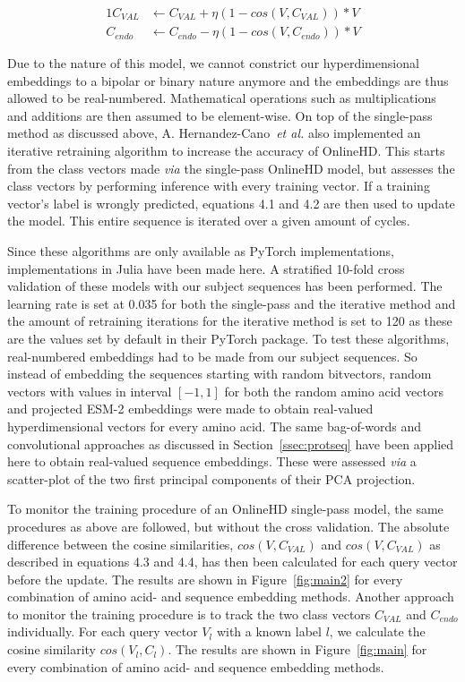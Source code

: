 \begin{alignat}{1}
    \label{eqn:onlinehd2}
    C_{VAL} &\leftarrow C_{VAL} + \eta (1 - cos(V, C_{VAL})) * V \\
    C_{endo} &\leftarrow C_{endo} - \eta (1 - cos(V, C_{endo})) * V
\end{alignat}

Due to the nature of this model, we cannot constrict our hyperdimensional embeddings to a bipolar or binary nature anymore and the embeddings are thus allowed to be real-numbered. Mathematical operations such as multiplications and additions are then assumed to be element-wise. On top of the single-pass method as discussed above, A. Hernandez-Cano~\textit{et al.} also implemented an iterative retraining algorithm to increase the accuracy of OnlineHD. This starts from the class vectors made \textit{via} the single-pass OnlineHD model, but assesses the class vectors by performing inference with every training vector. If a training vector's label is wrongly predicted, equations 4.1 and 4.2 are then used to update the model. This entire sequence is iterated over a given amount of cycles.

Since these algorithms are only available as PyTorch implementations, implementations in Julia have been made here. A stratified 10-fold cross validation of these models with our subject sequences has been performed. The learning rate is set at 0.035 for both the single-pass and the iterative method and the amount of retraining iterations for the iterative method is set to 120 as these are the values set by default in their PyTorch package. To test these algorithms, real-numbered embeddings had to be made from our subject sequences. So instead of embedding the sequences starting with random bitvectors, random vectors with values in interval $[-1, 1]$ for both the random amino acid vectors and projected ESM-2 embeddings were made to obtain real-valued hyperdimensional vectors for every amino acid. The same bag-of-words and convolutional approaches as discussed in Section~\ref{ssec:protseq} have been applied here to obtain real-valued sequence embeddings. These were assessed \textit{via} a scatter-plot of the two first principal components of their PCA projection.

To monitor the training procedure of an OnlineHD single-pass model, the same procedures as above are followed, but without the cross validation. The absolute difference between the cosine similarities, $cos(V, C_{VAL})$ and $cos(V, C_{VAL})$ as described in equations 4.3 and 4.4, has then been calculated for each query vector before the update. The results are shown in Figure~\ref{fig:main2} for every combination of amino acid- and sequence embedding methods. Another approach to monitor the training procedure is to track the two class vectors $C_{VAL}$ and $C_{endo}$ individually. For each query vector $V_{l}$ with a known label $l$, we calculate the cosine similarity $cos(V_{l}, C_{l})$. The results are shown in Figure~\ref{fig:main} for every combination of amino acid- and sequence embedding methods. 

